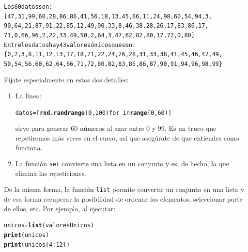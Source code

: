 \documentclass[10pt,a4paper]{article}\usepackage[]{graphicx}\usepackage[]{color}
\makeatletter
\newcommand{\hlnum}[1]{\textcolor[rgb]{0.686,0.059,0.569}{#1}}%
\newcommand{\hlopt}[1]{\textcolor[rgb]{0,0,0}{#1}}%
\newcommand{\hlstd}[1]{\textcolor[rgb]{0.345,0.345,0.345}{#1}}%
\newcommand{\hlkwb}[1]{\textcolor[rgb]{0.69,0.353,0.396}{#1}}%
\newcommand{\hlkwd}[1]{\textcolor[rgb]{0.737,0.353,0.396}{\textbf{#1}}}%
\newenvironment{kframe}{%
 \def\at@end@of@kframe{}%
 \ifinner\ifhmode%
  \def\at@end@of@kframe{\end{minipage}}%
  \begin{minipage}{\columnwidth}%
 \fi\fi%
 \def\FrameCommand##1{\hskip\@totalleftmargin \hskip-\fboxsep
 \colorbox{shadecolor}{##1}\hskip-\fboxsep
     \hskip-\linewidth \hskip-\@totalleftmargin \hskip\columnwidth}%
 \MakeFramed {\advance\hsize-\width
   \@totalleftmargin\z@ \linewidth\hsize
   \@setminipage}}%
 {\par\unskip\endMakeFramed%
 \at@end@of@kframe}
\newenvironment{knitrout}{}{} %
\makeatother
\begin{document}
\begin{knitrout}
\color{fgcolor}\begin{kframe}
\begin{alltt}
Los 60 datos son:
[47, 31, 99, 60, 28, 86, 86, 41, 56, 18, 13, 45, 66, 11, 24, 98, 60, 54, 94, 3,
 90, 64, 21, 87, 91, 22, 85, 12, 49, 90, 33, 8, 46, 38, 28, 26, 17, 83, 86, 17,
 71, 0, 66, 96, 2, 22, 33, 49, 50, 2, 64, 3, 47, 62, 82, 80, 17, 72, 0, 80]
Entre los datos hay 43 valores únicos que son:
\{0, 2, 3, 8, 11, 12, 13, 17, 18, 21, 22, 24, 26, 28, 31, 33, 38, 41, 45, 46, 47, 49,
 50, 54, 56, 60, 62, 64, 66, 71, 72, 80, 82, 83, 85, 86, 87, 90, 91, 94, 96, 98, 99\}
\end{alltt}
\end{kframe}
\end{knitrout}
Fíjate especialmente en estos dos detalles:
\begin{enumerate}
\item La línea:
\begin{knitrout}
\color{fgcolor}\begin{kframe}
\begin{alltt}
datos = [\hlkwd{rnd.randrange}(0, 100) for _ in \hlkwd{range}(0, 60)]
\end{alltt}
\end{kframe}
\end{knitrout}
sirve para generar 60 números al azar entre 0 y 99. Es un truco que repetiremos más veces en el curso, así que asegúrate de que entiendes como funciona.
\item La función {\tt set} convierte una lista en un conjunto y es, de hecho, la que elimina las repeticiones.
\end{enumerate}
De la misma forma, la función {\tt list} permite convertir un conjunto en una lista y de esa forma recuperar la posibilidad de ordenar los elementos, seleccionar parte de ellos, etc. Por ejemplo, al ejecutar:
\begin{knitrout}
\color{fgcolor}\begin{kframe}
\begin{alltt}
\hlstd{unicos} \hlkwb{=} \hlkwd{list}\hlstd{(valoresUnicos)}
\hlkwd{print}\hlstd{(unicos)}
\hlkwd{print}\hlstd{(unicos[}\hlnum{4}\hlopt{:}\hlnum{12}\hlstd{])}
\end{alltt}
\end{kframe}
\end{knitrout}
\end{document}
